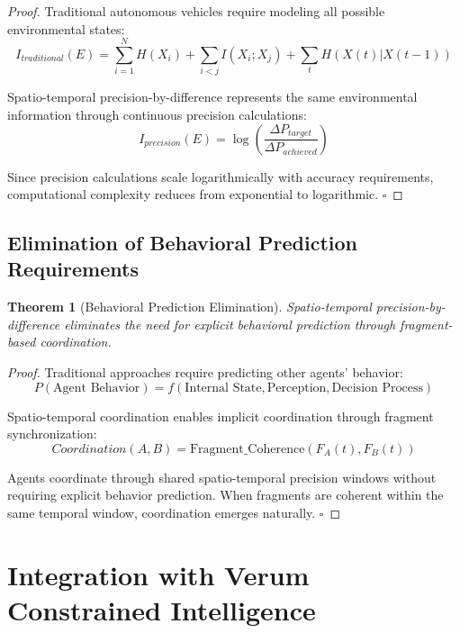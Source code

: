 \documentclass[12pt,a4paper]{article}
\newtheorem{theorem}{Theorem}[section]
\begin{document}
\begin{proof}
Traditional autonomous vehicles require modeling all possible environmental states:
\begin{equation}
I_{traditional}(E) = \sum_{i=1}^{N} H(X_i) + \sum_{i<j} I(X_i; X_j) + \sum_{t} H(X(t)|X(t-1))
\end{equation}

Spatio-temporal precision-by-difference represents the same environmental information through continuous precision calculations:
\begin{equation}
I_{precision}(E) = \log\left(\frac{\Delta P_{target}}{\Delta P_{achieved}}\right)
\end{equation}

Since precision calculations scale logarithmically with accuracy requirements, computational complexity reduces from exponential to logarithmic. $\square$
\end{proof}

\subsection{Elimination of Behavioral Prediction Requirements}

\begin{theorem}[Behavioral Prediction Elimination]
Spatio-temporal precision-by-difference eliminates the need for explicit behavioral prediction through fragment-based coordination.
\end{theorem}

\begin{proof}
Traditional approaches require predicting other agents' behavior:
\begin{equation}
P(\text{Agent Behavior}) = f(\text{Internal State}, \text{Perception}, \text{Decision Process})
\end{equation}

Spatio-temporal coordination enables implicit coordination through fragment synchronization:
\begin{equation}
Coordination(A,B) = \text{Fragment\_Coherence}(F_A(t), F_B(t))
\end{equation}

Agents coordinate through shared spatio-temporal precision windows without requiring explicit behavior prediction. When fragments are coherent within the same temporal window, coordination emerges naturally. $\square$
\end{proof}

\section{Integration with Verum Constrained Intelligence}
\end{document}
